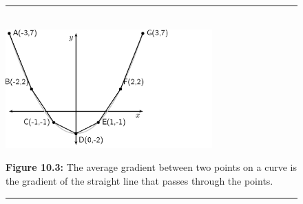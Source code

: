 	\begin{figure}[H] %
    \begin{center}
    \rule[.1in]{\figurerulewidth}{.005in} \\
        \label{m39223*uid3!!!underscore!!!media}\label{m39223*uid3!!!underscore!!!printimage}\includegraphics[width=300px]{col11306.imgs/m39223_MG10C12_003.png} %
      \vspace{2pt}
    \vspace{\rubberspace}\par \begin{cnxcaption}
	  \small \textbf{Figure 10.3: }The average gradient between two points on a curve is the gradient of the straight line that passes through the points.
	\end{cnxcaption}
    \vspace{.1in}
    \rule[.1in]{\figurerulewidth}{.005in} \\
    \end{center}
 \end{figure}       
      \label{m39223*uid4}
